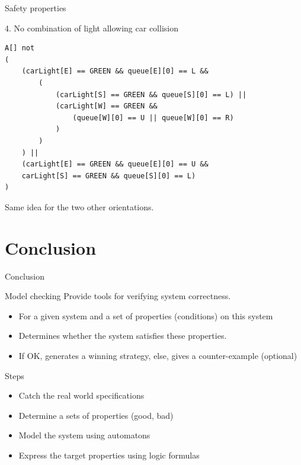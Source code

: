 \documentclass{bredelebeamer}
\begin{document}
\begin{frame}[fragile]{Safety properties}
\begin{block}{4. No combination of light allowing car collision}
\begin{verbatim}
A[] not 
(
    (carLight[E] == GREEN && queue[E][0] == L &&
        (
            (carLight[S] == GREEN && queue[S][0] == L) ||
            (carLight[W] == GREEN &&
                (queue[W][0] == U || queue[W][0] == R)
            )
        )
    ) || 
    (carLight[E] == GREEN && queue[E][0] == U &&
    carLight[S] == GREEN && queue[S][0] == L)
)
\end{verbatim}

Same idea for the two other orientations.
\end{block}
\end{frame}


\section{Conclusion}
\begin{frame}{Conclusion}

\begin{block}{Model checking}
Provide tools for verifying system correctness.
\begin{itemize}
\item For a given system and a set of properties (conditions) on this system
\item Determines whether the system satisfies these properties.
\item If OK, generates a winning strategy, else, gives a counter-example (optional)
\end{itemize}
\end{block}

\begin{block}{Steps}
\begin{itemize}
\item Catch the real world specifications
\item Determine a sets of properties (good, bad)
\item Model the system using automatons
\item Express the target properties using logic formulas  

\end{itemize}

\end{block}

\end{frame}
\end{document}
